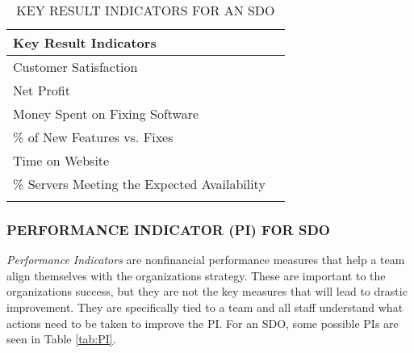 \documentclass[SDSUThesis.tex]{subfiles}
\begin{document}
            \begin{longtable}{@{}l l}
                \toprule%
                 \centering%
                 {\bfseries Key Result Indicators} &
                 \\
                
                \cmidrule[0.4pt](r{0.125em}){1-1}%
                \endhead
                
                Customer Satisfaction  \\
                \myrowcolour%
                Net Profit \\
                Money Spent on Fixing Software \\
                \myrowcolour%
                \% of New Features vs. Fixes \\
                Time on Website \\
                \myrowcolour%
                \% Servers Meeting the Expected Availability \\
                
                \bottomrule
                
                \caption{KEY RESULT INDICATORS FOR AN SDO}
                \label{tab:KRI}
            \end{longtable}
            
        
        \subsubsection{PERFORMANCE INDICATOR (PI) FOR SDO}
            \textit{Performance Indicators} are nonfinancial performance measures
            that help a team align themselves with the organizations 
            strategy.  These are important to the organizations success, but
            they are not the key measures that will lead to drastic improvement.  They are specifically tied to a team and all staff understand
            what actions need to be taken to improve the PI.
            For an SDO, some possible PIs are seen in Table \ref{tab:PI}.
                
\end{document}
